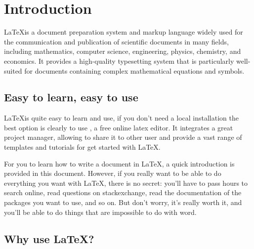 \section{Introduction}

\LaTeX is a document preparation system and markup language widely used for the communication and publication of scientific documents in many fields, including mathematics, computer science, engineering, physics, chemistry, and economics. It provides a high-quality typesetting system that is particularly well-suited for documents containing complex mathematical equations and symbols.

\subsection{Easy to learn, easy to use}

\LaTeX is quite easy to learn and use, if you don't need a local installation the best option is clearly to use \Overleaf, a free online latex editor. It integrates a great project manager, allowing to share it to other user and provide a vast range of templates and tutorials for get started with \LaTeX.

For you to learn how to write a document in \LaTeX, a quick introduction is provided in this document. However, if you really want to be able to do everything you want with \LaTeX, there is no secret: you'll have to pass hours to search online, read questions on stackexchange, read the documentation of the packages you want to use, and so on. But don't worry, it's really worth it, and you'll be able to do things that are impossible to do with word.

\subsection{Why use \LaTeX?}

